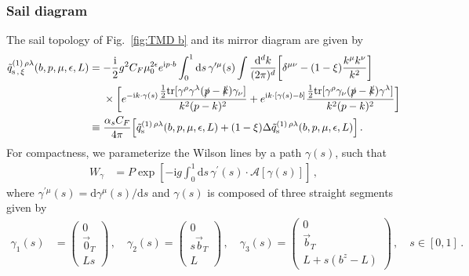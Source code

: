 \documentclass[11pt,a4paper]{article}
\DeclareRobustCommand{\fig}[1]{Fig.~\ref{fig:#1}}
\newcommand{\df}{\mathrm{d}}
\newcommand{\img}{\mathrm{i}}
\newcommand{\eps}{\epsilon}
\newcommand{\cA}{\mathcal{A}}
\newcommand{\nn}{\nonumber}
\newcommand{\as}{\alpha_s}
\newcommand{\tr}{\mathrm{tr}}
\newcommand{\pb}{{p{\cdot}b}}
\newcommand{\bt}{\vec b_T}
\begin{document}
\subsubsection{Sail diagram}
\label{sec:sail_diagram}

The sail topology of \fig{TMD b} and its mirror diagram are given by
\begin{align} \label{eq:sail_1}
 \tilde q^{(1)\,\rho\lambda}_{{\rm s}\,,\,\xi}(b,p,\mu,\eps,L) &
 = -\frac{\img}{2} g^2 C_F \mu_0^{2\eps} e^{\img \pb} \int_0^1 \df s \, \gamma^{\prime \mu}(s)
   \int\frac{\df^d k}{(2\pi)^d} \biggl[ \delta^{\mu\nu} - (1-\xi) \frac{k^\mu k^\nu}{k^2} \biggr]
   \nn\\&~\quad \times \biggl[
    e^{- \img k \cdot \gamma(s)} \frac{\frac12 \tr[\gamma^\rho \gamma^\lambda (\slashed{p}-\slashed{k}) \gamma_\nu]}{k^2 (p-k)^2}
  + e^{\img k \cdot [\gamma(s) - b]} \frac{\frac12 \tr[\gamma^\rho \gamma_\nu (\slashed{p}-\slashed{k}) \gamma^\lambda]}{k^2 (p-k)^2}\biggr]
\nn\\&
 \equiv \frac{\as C_F}{4\pi} \Bigl[ \tilde q^{(1)\,\rho\lambda}_{\rm s}(b,p,\mu,\eps,L) + (1-\xi) \Delta \tilde q^{(1)\,\rho\lambda}_{\rm s}(b,p,\mu,\eps,L) \Bigr]
\,.\end{align}
For compactness, we parameterize the Wilson lines by a path $\gamma(s)$, such that
\begin{align}
 W_\gamma &
 = P \exp\left[ - \img g \int_0^1 \df s \, \gamma^\prime(s) \cdot \cA[\gamma(s)] \right]
\,,\end{align}
where $\gamma^{\prime\mu}(s) = \df \gamma^\mu(s)/\df s$ and $\gamma(s)$ is composed of three straight segments given by
\begin{align} \label{eq:qtmd_path}
 \gamma_1(s) &= \left(\begin{matrix} 0 \\ \vec 0_T \\ L s \end{matrix}\right)
\,,\quad
 \gamma_2(s) = \left(\begin{matrix} 0 \\ s \bt  \\ L \end{matrix}\right)
\,,\quad
 \gamma_3(s) = \left(\begin{matrix} 0 \\ \bt \\ L  + s (b^z - L) \end{matrix}\right)
\,,\quad s \in [0,1]
\,.\end{align}
\end{document}
